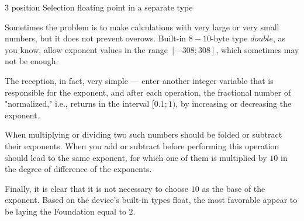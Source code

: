 \h3{ position Selection floating point in a separate type }

Sometimes the problem is to make calculations with very large or very small numbers, but it does not prevent overows. Built-in $8-10$-byte type $double$, as you know, allow exponent values in the range $[-308; 308]$, which sometimes may not be enough.

The reception, in fact, very simple --- enter another integer variable that is responsible for the exponent, and after each operation, the fractional number of "normalized," i.e., returns in the interval $[0.1; 1)$, by increasing or decreasing the exponent.

When multiplying or dividing two such numbers should be folded or subtract their exponents. When you add or subtract before performing this operation should lead to the same exponent, for which one of them is multiplied by $10$ in the degree of difference of the exponents.

Finally, it is clear that it is not necessary to choose $10$ as the base of the exponent. Based on the device's built-in types float, the most favorable appear to be laying the Foundation equal to $2$.